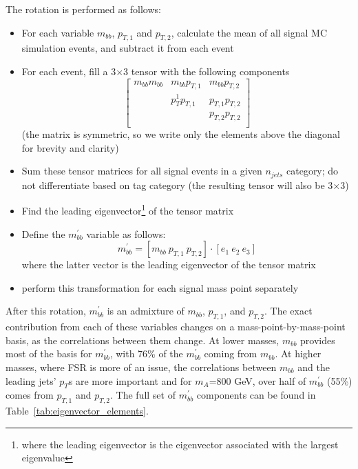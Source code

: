 The rotation is performed as follows:
\begin{itemize}
    \item For each variable $m_{bb}$, $p_{T,1}$ and $p_{T,2}$, calculate the mean 
    of all signal MC simulation events, and subtract it from each event
    \item For each event, fill a 3$\times$3 tensor with the following components
    \begin{equation}
        \begin{bmatrix}
        m_{bb}m_{bb} & m_{bb}p_{T,1} & m_{bb}p_{T,2} \\
                     & p_T^1 p_{T,1} & p_{T,1} p_{T,2} \\
                     &               & p_{T,2} p_{T,2} \\ 
        \end{bmatrix}
    \end{equation}
    (the matrix is symmetric, so we write only the elements above the diagonal for
    brevity and clarity)
    \item Sum these tensor matrices for all signal events in a given $n_{jets}$ category;
    do not differentiate based on tag category
    (the resulting tensor will also be 3$\times$3)
    \item Find the leading eigenvector\footnote{where the leading eigenvector is the
    eigenvector associated with the largest eigenvalue} of the tensor matrix
    \item Define the $m_{bb}^{'}$ variable as follows:
    \begin{equation}
        m_{bb}^{'} = [m_{bb}\ p_{T,1}\ p_{T,2}] \cdot [e_1\ e_2\ e_3]
    \end{equation}
    where the latter vector is the leading eigenvector of the tensor matrix
    \item perform this transformation for each signal mass point separately
\end{itemize}

After this rotation, $m_{bb}^{'}$ is an admixture of $m_{bb}$, $p_{T,1}$, and 
$p_{T,2}$.  The exact contribution from each of these variables changes on a mass-point-by-mass-point
basis, as the correlations between them change.  At lower masses, $m_{bb}$ provides
most of the basis for $m_{bb}^{'}$, with 76\% of the $m_{bb}^{'}$ coming from 
$m_{bb}$.  At higher masses, where FSR is more of an issue, the correlations between 
$m_{bb}$ and the leading jets' $p_T$s are more important and for $m_A$=800 GeV,
over half of $m_{bb}^{'}$ (55\%) comes from $p_{T,1}$ and $p_{T,2}$.  The full set 
of $m_{bb}^{'}$ components can be found in Table~\ref{tab:eigenvector_elements}.



